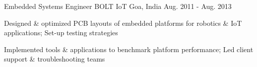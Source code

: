 \begin{cventries}
  \cventry
    {Embedded Systems Engineer} %
    {BOLT IoT} %
    {Goa, India} %
    {Aug. 2011 - Aug. 2013} %
    {
      \begin{cvitems} %
      	\item {Designed \& optimized PCB layouts of embedded platforms for robotics \& IoT applications; Set-up testing strategies}
        \item {Implemented tools \& applications to benchmark platform performance; Led client support \& troubleshooting teams}
      \end{cvitems}
    }
    
    \vspace{-0.4cm}

\end{cventries}
